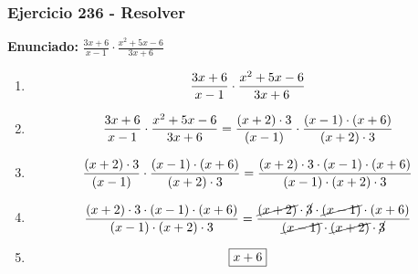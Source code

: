 \documentclass[11pt,a4paper]{article}
\newcommand{\fitmath}[1]{%
\[
\setbox0=\hbox{$\displaystyle #1$}%
\ifdim\wd0>\linewidth
\resizebox{\linewidth}{!}{$\displaystyle #1$}%
\else
#1%
\fi
\]
}
\begin{document}
\subsubsection*{Ejercicio 236 - Resolver}
\textbf{Enunciado:} $ \frac{3 x + 6}{x - 1} \cdot \frac{x^{2} + 5 x - 6}{3 x + 6} $\par
\begin{enumerate}[leftmargin=2em]
\item \fitmath{\frac{3 x + 6}{x - 1} \cdot \frac{x^{2} + 5 x - 6}{3 x + 6}}
\item \fitmath{\frac{3 x + 6}{x - 1} \cdot \frac{x^{2} + 5 x - 6}{3 x + 6}= \frac{\left(x + 2\right)\cdot 3}{\left(x - 1\right)} \cdot \frac{\left(x - 1\right)\cdot \left(x + 6\right)}{\left(x + 2\right)\cdot 3}}
\item \fitmath{\frac{\left(x + 2\right)\cdot 3}{\left(x - 1\right)}\cdot \frac{\left(x - 1\right)\cdot \left(x + 6\right)}{\left(x + 2\right)\cdot 3}= \frac{\left(x + 2\right)\cdot 3\cdot \left(x - 1\right)\cdot \left(x + 6\right)}{\left(x - 1\right)\cdot \left(x + 2\right)\cdot 3}}
\item \fitmath{\frac{\left(x + 2\right)\cdot 3\cdot \left(x - 1\right)\cdot \left(x + 6\right)}{\left(x - 1\right)\cdot \left(x + 2\right)\cdot 3}= \frac{\cancel{\left(x + 2\right)}\cdot \cancel{3}\cdot \cancel{\left(x - 1\right)}\cdot \left(x + 6\right)}{\cancel{\left(x - 1\right)}\cdot \cancel{\left(x + 2\right)}\cdot \cancel{3}}}
\item \fitmath{\boxed{x + 6}}
\end{enumerate}

\vspace{0.12cm}
\end{document}
